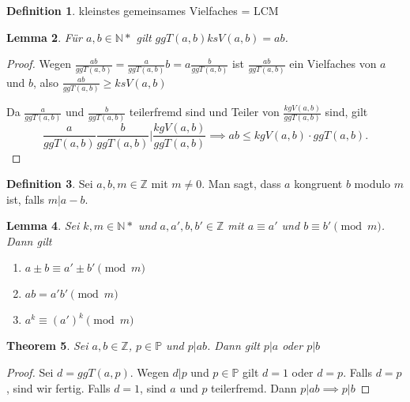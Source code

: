 \documentclass[prb,12pt]{revtex4-2}
\newtheorem{Theorem}{Theorem}
\newtheorem{Lemma}[Theorem]{Lemma}
\theoremstyle{definition}
\theoremstyle{definition}
\newtheorem{Definition}[Theorem]{Definition}
\newenvironment{parts}{\begin{enumerate}[label=(\alph*)]}{\end{enumerate}}
\newcommand{\N}{\mathbb{N}}
\newcommand{\Z}{\mathbb{Z}}
\begin{document}
\begin{Definition}
	kleinstes gemeinsames Vielfaches = LCM
\end{Definition}

\begin{Lemma}
	F\"{u}r $a,b\in \N*$ gilt $ggT(a,b)ksV(a,b)=ab$. 
\end{Lemma}

\begin{proof}
	Wegen $\frac{ab}{ggT(a,b)}=\frac{a}{ggT(a,b)}b=a \frac{b}{ggT(a,b)}$ ist $\frac{ab}{ggT(a,b)}$ ein Vielfaches von $a$ und $b$, also $\frac{ab}{ggT(a,b)}\ge ksV(a,b)$

	Da $\frac{a}{ggT(a,b)}$ und $\frac{b}{ggT(a,b)}$ teilerfremd sind und Teiler von $\frac{kgV(a,b)}{ggT(a,b)}$ sind, gilt
	\[
	\frac{a}{ggT(a,b)}\frac{b}{ggT(a,b)}|\frac{kgV(a,b)}{ggT(a,b)}\implies ab\le kgV(a,b)\cdot ggT(a,b)
	.\] 
\end{proof}

\begin{Definition}
	Sei $a,b,m\in \Z$ mit $m\neq 0$. Man sagt, dass $a$ kongruent $b$ modulo $m$ ist, falls $m|a-b$. 
\end{Definition}

\begin{Lemma}
	Sei $k,m\in \N*$ und $a,a',b,b'\in \Z$ mit $a\equiv a'$ und $b\equiv b'\pmod{m}$. Dann gilt
	\begin{parts}
	\item $a\pm b\equiv a'\pm b'\pmod{m}$
	\item $ab=a'b'\pmod{m}$ 
	\item $a^k\equiv \left( a' \right) ^k \pmod{m}$
	\end{parts}
\end{Lemma}

\begin{Theorem}
	Sei $a,b\in\Z$, $p\in\mathbb{P}$ und $p|ab$. Dann gilt $p|a$ oder $p|b$
\end{Theorem}

\begin{proof}
	Sei $d=ggT(a,p)$. Wegen $d|p$ und $p\in\mathbb{P}$ gilt $d=1$ oder $d=p$. Falls $d=p$, sind wir fertig. Falls $d=1$, sind $a$ und $p$ teilerfremd. Dann $p|ab\implies p|b$
\end{proof}
\end{document}
